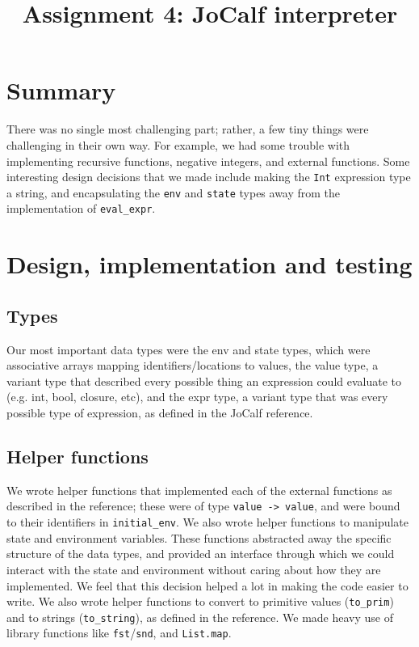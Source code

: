 

\title{Assignment 4: JoCalf interpreter}
\author{\name}
\maketitle

\section{Summary}
There was no single most challenging part; rather, a few tiny things were challenging in their own way. For example, we had some trouble with implementing recursive functions, negative integers, and external functions. Some interesting design decisions that we made include making the \lstinline{Int} expression type a string, and encapsulating the \lstinline{env} and \lstinline{state} types away from the implementation of \lstinline{eval_expr}.

\section{Design, implementation and testing}

\subsection{Types}
Our most important data types were the env and state types, which were associative arrays mapping identifiers/locations to values, the value type, a variant type that described every possible thing an expression could evaluate to (e.g. int, bool, closure, etc), and the expr type, a variant type that was every possible type of expression, as defined in the JoCalf reference.

\subsection{Helper functions}
We wrote helper functions that implemented each of the external functions as described in the reference; these were of type \lstinline{value -> value}, and were bound to their identifiers in \lstinline{initial_env}. We also wrote helper functions to manipulate state and environment variables. These functions abstracted away the specific structure of the data types, and provided an interface through which we could interact with the state and environment without caring about how they are implemented. We feel that this decision helped a lot in making the code easier to write. We also wrote helper functions to convert to primitive values (\lstinline{to_prim}) and to strings (\lstinline{to_string}), as defined in the reference. We made heavy use of library functions like \lstinline{fst}/\lstinline{snd}, and \lstinline{List.map}.

